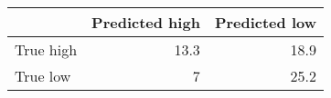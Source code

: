 \begin{tabular}{lrr}
\hline
           &   Predicted high &   Predicted low \\
\hline
 True high &             13.3 &            18.9 \\
 True low  &              7   &            25.2 \\
\hline
\end{tabular}